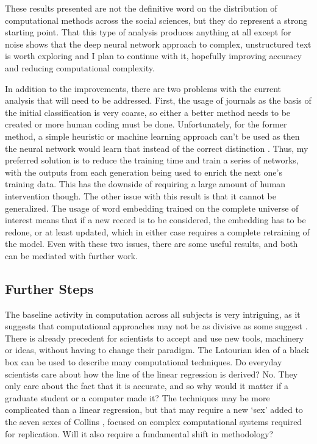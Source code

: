 \documentclass[12pt, a4paper]{article}
\begin{document}
These results presented are not the definitive word on the distribution of computational methods across the social sciences, but they do represent a strong starting point. That this type of analysis produces anything at all except for noise shows that the deep neural network approach to complex, unstructured text is worth exploring and I plan to continue with it, hopefully improving accuracy and reducing computational complexity. 

In addition to the improvements, there are two problems with the current analysis that will need to be addressed. First, the usage of journals as the basis of the initial classification is very coarse, so either a better method needs to be created or more human coding must be done. Unfortunately, for the former method, a simple heuristic or machine learning approach can't be used as then the neural network would learn that instead of the correct distinction \citep{deep_learning_chapter12}. Thus, my preferred solution is to reduce the training time and train a series of networks, with the outputs from each generation being used to enrich the next one's training data. This has the downside of requiring a large amount of human intervention though. The other issue with this result is that it cannot be generalized. The usage of word embedding trained on the complete universe of interest means that if a new record is to be considered, the embedding has to be redone, or at least updated, which in either case requires a complete retraining of the model. Even with these two issues, there are some useful results, and both can be mediated with further work.

\subsection{Further Steps}

The baseline activity in computation across all subjects is very intriguing, as it suggests that computational approaches may not be as divisive as some suggest \citep{watts2007twenty}\citep{lazer2009life}. There is already precedent for scientists to accept and use new tools, machinery or ideas, without having to change their paradigm. The Latourian idea of a black box \citep{latour1987science} can be used to describe many computational techniques. Do everyday scientists care about how the line of the linear regression is derived? No. They only care about the fact that it is accurate, and so why would it matter if a graduate student or a computer made it? The techniques may be more complicated than a linear regression, but that may require a new `sex' added to the seven sexes of Collins \citep{collins1975seven}, focused on complex computational systems required for replication. Will it also require a fundamental shift in methodology? 
\end{document}
